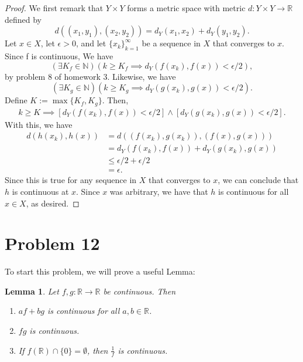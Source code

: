 \documentclass[10pt,a4paper]{article}
\theoremstyle{theorem}
\newtheorem{lemma}{Lemma}
\theoremstyle{definition}
\begin{document}
\begin{proof}
We first remark that $Y \times Y$ forms a metric space with metric $d: Y \times Y \to \mathbb{R}$ defined by 
$$d((x_1, y_1), (x_2, y_2)) = d_Y(x_1, x_2) + d_Y(y_1, y_2).$$
Let $x \in X$, let $\epsilon >0$, and let $\{x_k\}_{k = 1}^\infty$ be a sequence in $X$ that converges to $x$. Since f is continuous, We have 
$$(\exists K_f \in \mathbb{N})(k \geq K_f \implies d_Y(f(x_k), f(x)) < \epsilon/2),$$
by problem 8 of homework 3. Likewise, we have
$$(\exists K_g \in \mathbb{N})(k \geq K_g \implies d_Y(g(x_k), g(x)) < \epsilon/2).$$
Define $K := \max\{K_f, K_g \}$. Then, 
\begin{align*}
k \geq K \implies [d_Y(f(x_k), f(x)) < \epsilon/2] \land [d_Y(g(x_k), g(x)) < \epsilon/2].
\end{align*}
With this, we have 
\begin{align*}
d(h(x_k), h(x)) &=d((f(x_k), g(x_k)), (f(x), g(x)))\\
&= d_Y(f(x_k), f(x)) + d_Y(g(x_k), g(x))\\
&\leq \epsilon/2 + \epsilon/2\\
&= \epsilon.
\end{align*}
Since this is true for any sequence in $X$ that converges to $x$, we can conclude that $h$ is continuous at $x$.  Since $x$ was arbitrary, we have that $h$ is continuous for all $x \in X$, as desired.
\end{proof}

\section*{Problem 12}
To start this problem, we will prove a useful Lemma:
\begin{lemma}
Let $f,g: \mathbb{R} \to \mathbb{R}$ be continuous. Then
\begin{enumerate}
\item $af + bg$ is continuous for all $a, b \in \mathbb{R}$.
\item $fg$ is continuous.
\item If $f(\mathbb{R}) \cap \{0\} = \emptyset$, then $\frac{1}{f}$ is continuous.
\end{enumerate}
\end{lemma}
\end{document}
